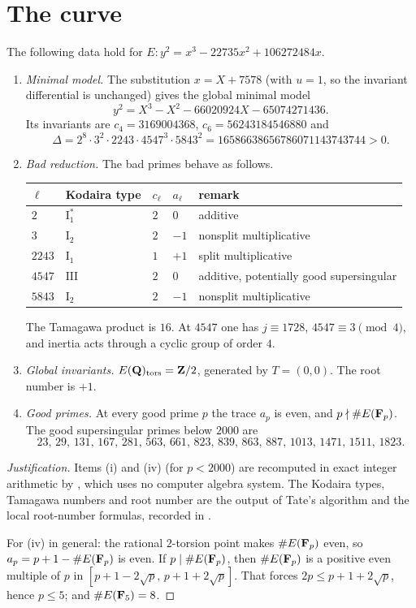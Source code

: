 \section{The curve}\label{sec:curve}

\begin{proposition}\label{prop:curve}
The following data hold for $E\colon y^2=x^3-22735x^2+106272484x$.
\begin{enumerate}[label=(\roman*)]
\item \emph{Minimal model.} The substitution $x=X+7578$ (with $u=1$, so the invariant differential is unchanged) gives the global minimal model
\[
y^2=X^3-X^2-66020924X-65074271436 .
\]
Its invariants are $c_4=3169004368$, $c_6=56243184546880$ and
\[
\Delta=2^8\cdot3^2\cdot2243\cdot4547^3\cdot5843^2=16586638656786071143743744>0 .
\]
\item \emph{Bad reduction.} The bad primes behave as follows.
\begin{center}
\begin{tabular}{@{}lllll@{}}
\toprule
$\ell$ & Kodaira type & $c_\ell$ & $a_\ell$ & remark\\ \midrule
$2$ & $\mathrm{I}_1^*$ & $2$ & $0$ & additive\\
$3$ & $\mathrm{I}_2$ & $2$ & $-1$ & nonsplit multiplicative\\
$2243$ & $\mathrm{I}_1$ & $1$ & $+1$ & split multiplicative\\
$4547$ & $\mathrm{III}$ & $2$ & $0$ & additive, potentially good supersingular\\
$5843$ & $\mathrm{I}_2$ & $2$ & $-1$ & nonsplit multiplicative\\ \bottomrule
\end{tabular}
\end{center}
The Tamagawa product is $16$. At $4547$ one has $j\equiv1728$, $4547\equiv3\pmod 4$, and inertia acts through a cyclic group of order $4$.
\item \emph{Global invariants.} $E(\mathbf{Q})_{\mathrm{tors}}=\mathbf{Z}/2$, generated by $T=(0,0)$. The root number is $+1$.
\item \emph{Good primes.} At every good prime $p$ the trace $a_p$ is even, and $p\nmid\#E(\mathbf{F}_p)$. The good supersingular primes below $2000$ are
\[
23,\,29,\,131,\,167,\,281,\,563,\,661,\,823,\,839,\,863,\,887,\,1013,\,1471,\,1511,\,1823 .
\]
\end{enumerate}
\end{proposition}

\begin{proof}[Justification]
Items (i) and (iv) (for $p<2000$) are recomputed in exact integer arithmetic by , which uses no computer algebra system. The Kodaira types, Tamagawa numbers and root number are the output of Tate's algorithm and the local root-number formulas, recorded in .

For (iv) in general: the rational $2$-torsion point makes $\#E(\mathbf{F}_p)$ even, so $a_p=p+1-\#E(\mathbf{F}_p)$ is even. If $p\mid\#E(\mathbf{F}_p)$, then $\#E(\mathbf{F}_p)$ is a positive even multiple of $p$ in $[p+1-2\sqrt p,\,p+1+2\sqrt p]$. That forces $2p\le p+1+2\sqrt p$, hence $p\le5$; and $\#E(\mathbf{F}_5)=8$.
\end{proof}

